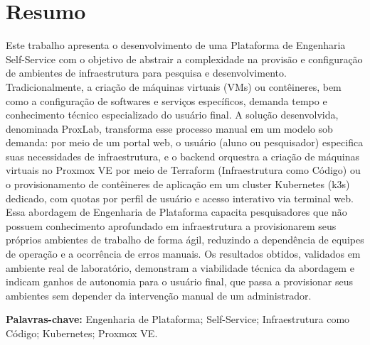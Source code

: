 \chapter*{Resumo}

\par Este trabalho apresenta o desenvolvimento de uma Plataforma de Engenharia Self-Service com o objetivo de abstrair a complexidade na provisão e configuração de ambientes de infraestrutura para pesquisa e desenvolvimento. Tradicionalmente, a criação de máquinas virtuais (VMs) ou contêineres, bem como a configuração de softwares e serviços específicos, demanda tempo e conhecimento técnico especializado do usuário final. A solução desenvolvida, denominada ProxLab, transforma esse processo manual em um modelo sob demanda: por meio de um portal web, o usuário (aluno ou pesquisador) especifica suas necessidades de infraestrutura, e o backend orquestra a criação de máquinas virtuais no Proxmox VE por meio de Terraform (Infraestrutura como Código) ou o provisionamento de contêineres de aplicação em um cluster Kubernetes (k3s) dedicado, com quotas por perfil de usuário e acesso interativo via terminal web. Essa abordagem de Engenharia de Plataforma capacita pesquisadores que não possuem conhecimento aprofundado em infraestrutura a provisionarem seus próprios ambientes de trabalho de forma ágil, reduzindo a dependência de equipes de operação e a ocorrência de erros manuais. Os resultados obtidos, validados em ambiente real de laboratório, demonstram a viabilidade técnica da abordagem e indicam ganhos de autonomia para o usuário final, que passa a provisionar seus ambientes sem depender da intervenção manual de um administrador.

\vspace{2em}

\textbf{Palavras-chave:} Engenharia de Plataforma; Self-Service; Infraestrutura como Código; Kubernetes; Proxmox VE.

\vfill

